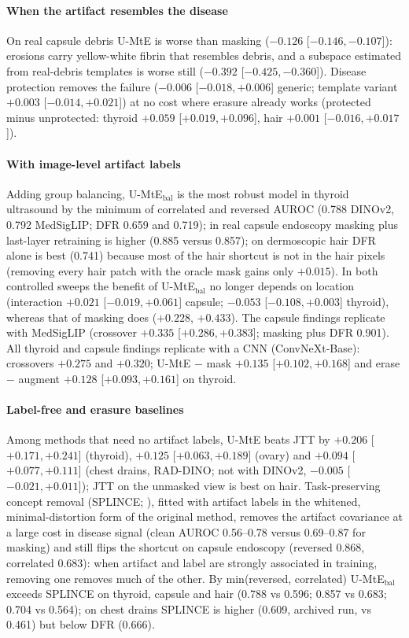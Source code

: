 \paragraph{When the artifact resembles the disease}
On real capsule debris U-MtE is worse than masking ($-0.126$ [$-0.146, -0.107$]): erosions carry yellow-white fibrin
that resembles debris, and a subspace estimated from real-debris templates is worse still ($-0.392$
[$-0.425, -0.360$]). Disease protection removes the failure ($-0.006$ [$-0.018, +0.006$] generic; template variant
$+0.003$ [$-0.014, +0.021$]) at no cost where erasure already works (protected minus unprotected: thyroid $+0.059$
[$+0.019, +0.096$], hair $+0.001$ [$-0.016, +0.017$]).

\paragraph{With image-level artifact labels}
Adding group balancing, U-MtE$_{\text{bal}}$ is the most robust model in thyroid ultrasound by the minimum of
correlated and reversed AUROC (0.788 DINOv2, 0.792 MedSigLIP; DFR 0.659 and 0.719); in real capsule endoscopy
masking plus last-layer retraining is higher (0.885 versus 0.857); on dermoscopic hair DFR alone is best (0.741)
because most of the hair shortcut is not in the hair pixels (removing every hair patch with the oracle mask gains
only $+0.015$). In both controlled sweeps the benefit of U-MtE$_{\text{bal}}$ no longer depends on location
(interaction $+0.021$ [$-0.019, +0.061$] capsule; $-0.053$ [$-0.108, +0.003$] thyroid), whereas that of masking
does ($+0.228$, $+0.433$).
The capsule findings replicate with MedSigLIP (crossover $+0.335$ [$+0.286, +0.383$]; masking plus DFR 0.901).
All thyroid and capsule findings replicate with a CNN (ConvNeXt-Base): crossovers $+0.275$ and $+0.320$; U-MtE $-$ mask $+0.135$ [$+0.102, +0.168$] and erase $-$ augment $+0.128$ [$+0.093, +0.161$] on thyroid.

\paragraph{Label-free and erasure baselines}
Among methods that need no artifact labels, U-MtE beats JTT \citep{liu2021jtt} by $+0.206$ [$+0.171, +0.241$]
(thyroid), $+0.125$ [$+0.063, +0.189$] (ovary) and $+0.094$ [$+0.077, +0.111$] (chest drains, RAD-DINO; not with
DINOv2, $-0.005$ [$-0.021, +0.011$]); JTT on the unmasked
view is best on hair. Task-preserving concept removal (SPLINCE; \citealp{splice2025}), fitted with artifact labels in the whitened,
minimal-distortion form of the original method, removes the artifact covariance at a large cost in disease signal
(clean AUROC 0.56--0.78 versus 0.69--0.87 for masking) and still flips the shortcut on capsule endoscopy (reversed
0.868, correlated 0.683): when artifact and label are strongly associated in training, removing one removes much of
the other. By min(reversed, correlated) U-MtE$_{\text{bal}}$ exceeds SPLINCE on thyroid, capsule and hair (0.788 vs
0.596; 0.857 vs 0.683; 0.704 vs 0.564); on chest drains SPLINCE is higher (0.609, archived run, vs 0.461) but below
DFR (0.666).

